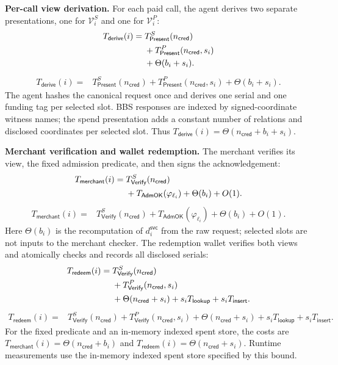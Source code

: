 \documentclass[letterpaper]{article}
\begin{document}
\textbf{Per-call view derivation.}
For each paid call, the agent derives two separate presentations, one for
\(\mathcal V_i^S\) and one for \(\mathcal V_i^P\):
\ifdefined\MMAAAITwoColumn
\begin{align}
T_{\mathsf{derive}}(i)={}&
T_{\mathsf{Present}}^S(n_{\mathsf{cred}})\notag\\
&+T_{\mathsf{Present}}^P(n_{\mathsf{cred}},s_i)\notag\\
&+\Theta(b_i+s_i).
\label{eq:complexity-derive}
\end{align}
\else
\begin{align}
T_{\mathsf{derive}}(i)={}&
T_{\mathsf{Present}}^S(n_{\mathsf{cred}})
+T_{\mathsf{Present}}^P(n_{\mathsf{cred}},s_i)+\Theta(b_i+s_i).
\label{eq:complexity-derive}
\end{align}
\fi
The agent hashes the canonical request once and derives one serial and one
funding tag per selected slot.  BBS responses
are indexed by signed-coordinate witness names; the spend presentation adds a
constant number of relations and disclosed coordinates per selected slot.
Thus \(T_{\mathsf{derive}}(i)=
\Theta(n_{\mathsf{cred}}+b_i+s_i)\).

\textbf{Merchant verification and wallet redemption.}
The merchant verifies its view, the fixed admission predicate, and then signs
the acknowledgement:
\ifdefined\MMAAAITwoColumn
\begin{align}
T_{\mathsf{merchant}}(i)={}&T_{\mathsf{Verify}}^S(n_{\mathsf{cred}})\notag\\
&+T_{\mathsf{AdmOK}}(\varphi_{\ell_i})+\Theta(b_i)+O(1).
\label{eq:complexity-merchant}
\end{align}
\else
\begin{align}
T_{\mathsf{merchant}}(i)={}&T_{\mathsf{Verify}}^S(n_{\mathsf{cred}})
+T_{\mathsf{AdmOK}}(\varphi_{\ell_i})+\Theta(b_i)+O(1).
\label{eq:complexity-merchant}
\end{align}
\fi
Here \(\Theta(b_i)\) is the recomputation of
\(d_i^{\mathsf{svc}}\) from the raw request; selected slots are not inputs to
the merchant checker.
The redemption wallet verifies both views and atomically checks and records all
disclosed serials:
\ifdefined\MMAAAITwoColumn
\begin{align}
T_{\mathsf{redeem}}(i)={}&T_{\mathsf{Verify}}^S(n_{\mathsf{cred}})\notag\\
&+T_{\mathsf{Verify}}^P(n_{\mathsf{cred}},s_i)\notag\\
&+\Theta(n_{\mathsf{cred}}+s_i)
+s_iT_{\mathsf{lookup}}+s_iT_{\mathsf{insert}}.
\label{eq:complexity-redeem}
\end{align}
\else
\begin{align}
T_{\mathsf{redeem}}(i)={}&T_{\mathsf{Verify}}^S(n_{\mathsf{cred}})
+T_{\mathsf{Verify}}^P(n_{\mathsf{cred}},s_i)+\Theta(n_{\mathsf{cred}}+s_i)
+s_iT_{\mathsf{lookup}}+s_iT_{\mathsf{insert}}.
\label{eq:complexity-redeem}
\end{align}
\fi
For the fixed predicate and an in-memory indexed spent store, the costs are
\(T_{\mathsf{merchant}}(i)=\Theta(n_{\mathsf{cred}}+b_i)\) and
\(T_{\mathsf{redeem}}(i)=\Theta(n_{\mathsf{cred}}+s_i)\). Runtime measurements
use the in-memory indexed spent store specified by this bound.
\end{document}
